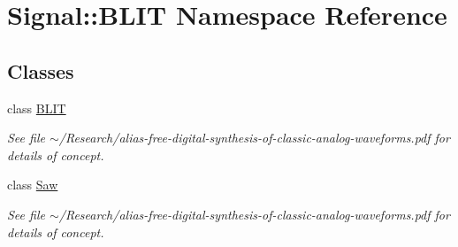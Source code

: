 \hypertarget{namespaceSignal_1_1BLIT}{\section{Signal\+:\+:B\+L\+I\+T Namespace Reference}
\label{namespaceSignal_1_1BLIT}
}
\subsection*{Classes}
\begin{DoxyCompactItemize}
\item 
class \hyperlink{classSignal_1_1BLIT_1_1BLIT}{B\+L\+I\+T}
\begin{DoxyCompactList}\small\item\em See file $\sim$/\+Research/alias-\/free-\/digital-\/synthesis-\/of-\/classic-\/analog-\/waveforms.pdf for details of concept. \end{DoxyCompactList}\item 
class \hyperlink{classSignal_1_1BLIT_1_1Saw}{Saw}
\begin{DoxyCompactList}\small\item\em See file $\sim$/\+Research/alias-\/free-\/digital-\/synthesis-\/of-\/classic-\/analog-\/waveforms.pdf for details of concept. \end{DoxyCompactList}\end{DoxyCompactItemize}
